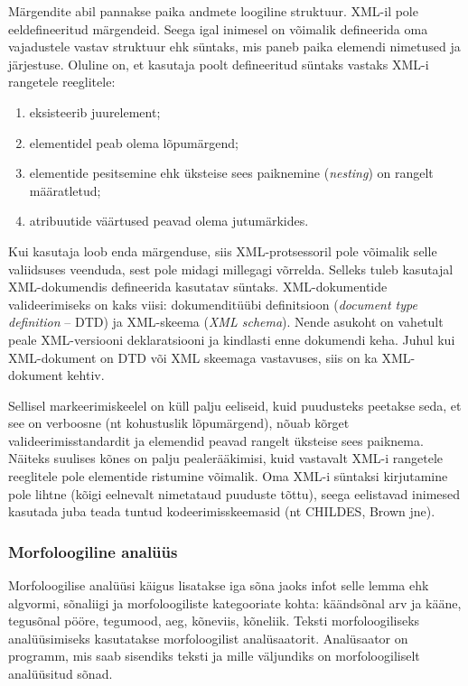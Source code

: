 \documentclass[12pt]{article}
\begin{document}
Märgendite abil pannakse paika andmete loogiline struktuur. XML-il pole eeldefineeritud märgendeid. Seega igal inimesel on võimalik defineerida oma vajadustele vastav struktuur ehk süntaks, mis paneb paika elemendi nimetused ja järjestuse. Oluline on, et kasutaja poolt defineeritud süntaks vastaks XML-i rangetele reeglitele:

\begin{enumerate}
    \item eksisteerib juurelement;
    \item elementidel peab olema lõpumärgend;
    \item elementide pesitsemine ehk üksteise sees paiknemine (\emph{nesting}) on rangelt määratletud;
    \item atribuutide väärtused peavad olema jutumärkides.
    \citep{XML}
\end{enumerate}

Kui kasutaja loob enda märgenduse, siis XML-protsessoril pole võimalik selle valiidsuses veenduda, sest pole midagi millegagi võrrelda. Selleks tuleb kasutajal XML-dokumendis defineerida kasutatav süntaks. XML-dokumentide valideerimiseks on kaks viisi: dokumenditüübi definitsioon (\emph{document type definition} -- DTD) ja XML-skeema (\emph{XML schema}). Nende asukoht on vahetult peale XML-versiooni deklaratsiooni ja kindlasti enne dokumendi keha. Juhul kui XML-doku\-ment on DTD või XML skeemaga vastavuses, siis on ka XML-dokument kehtiv. \citep{XML}

Sellisel markeerimiskeelel on küll palju eeliseid, kuid puudusteks peetakse seda, et see on verboosne (nt kohustuslik lõpumärgend), nõuab kõrget valideerimisstandardit ja elemendid peavad rangelt üksteise sees paiknema. Näiteks suulises kõnes on palju pealerääkimisi, kuid vastavalt XML-i rangetele reeglitele pole elementide ristumine võimalik. Oma XML-i süntaksi kirjutamine pole lihtne (kõigi eelnevalt nimetataud puuduste tõttu), seega eelistavad inimesed kasutada juba teada tuntud kodeerimisskeemasid (nt CHILDES, Brown jne). \citep{LEECH}

\subsubsection{Morfoloogiline analüüs}

Morfoloogilise analüüsi käigus lisatakse iga sõna jaoks infot selle lemma ehk algvormi, sõnaliigi ja morfoloogiliste kategooriate kohta: käändsõnal arv ja kääne, tegusõnal pööre, tegumood, aeg, kõneviis, kõneliik. Teksti morfoloogiliseks analüüsimiseks kasutatakse morfoloogilist analüsaatorit. Analüsaator on programm, mis saab sisendiks teksti ja mille väljundiks on morfoloogiliselt analüüsitud sõnad. \citep[89]{KV}
\end{document}
